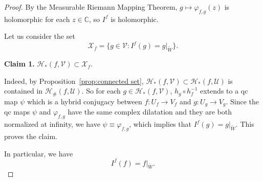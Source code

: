\documentclass{amsart}
\numberwithin{equation}{section}
\newcommand{\C}{\mathbb C}
\theoremstyle{definition}
\theoremstyle{remark}
\begin{document}
\begin{proof}
By the Measurable Riemann Mapping Theorem, $g\mapsto \varphi_{f,g}(z)$ is holomorphic for each $z\in \C$, so $I^f$ is holomorphic. 





Let us consider the set 
$$\mathcal{X}_f=\{g\in \mathcal{V}: I^f(g)=g|_{\widetilde{W}}\}.$$

{\bf Claim 1.} $\mathcal{H}_*(f, \mathcal{V})\subset \mathcal{X}_f$. 

Indeed, by Proposition~\ref{prop:connected set}, $\mathcal{H}_*(f,\mathcal{V})\subset \mathcal{H}_*(f,\mathcal{U})$ is contained in $\mathcal{H}_\#(f,\mathcal{U})$. 
So for each $g\in \mathcal{H}_*(f,\mathcal{V})$, $h_g\circ h_f^{-1}$ extends to a qc map $\psi$ which is a hybrid conjugacy between $f: U_f\to V_f$ and $g: U_g\to V_g$. Since the qc maps $\psi$ and $\varphi_{f,g}$ have the same complex dilatation 
and they are both normalized at infinity, we have $\psi\equiv \varphi_{f,g}$, which implies that $I^f(g)=g|_{\widetilde{W}}$. This proves the claim.

In particular, we have 
\begin{equation}\label{eqn:If0}
I^f(f)=f|_{\widetilde{W}}.
\end{equation}

\end{proof}
\end{document}
